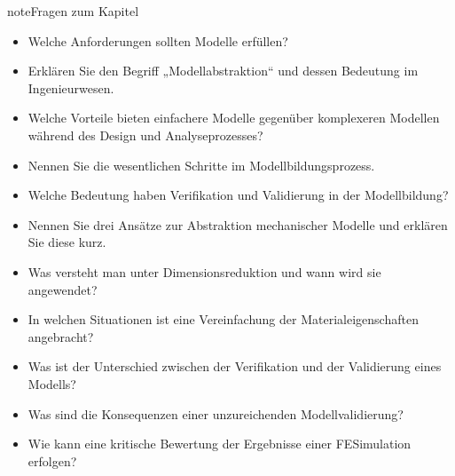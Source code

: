 \documentclass[letterpaper,10pt,german]{jupyterBook}
\begin{document}
\begin{sphinxadmonition}{note}{Fragen zum Kapitel}
\sphinxAtStartPar
{}
\begin{itemize}
\item {} 
\sphinxAtStartPar
Welche Anforderungen sollten Modelle erfüllen?

\item {} 
\sphinxAtStartPar
Erklären Sie den Begriff „Modellabstraktion“ und dessen Bedeutung im Ingenieurwesen.

\item {} 
\sphinxAtStartPar
Welche Vorteile bieten einfachere Modelle gegenüber komplexeren Modellen während des Design\sphinxhyphen{} und Analyseprozesses?

\end{itemize}

\sphinxAtStartPar
{}
\begin{itemize}
\item {} 
\sphinxAtStartPar
Nennen Sie die wesentlichen Schritte im Modellbildungsprozess.

\item {} 
\sphinxAtStartPar
Welche Bedeutung haben Verifikation und Validierung in der Modellbildung?

\end{itemize}

\sphinxAtStartPar
{}
\begin{itemize}
\item {} 
\sphinxAtStartPar
Nennen Sie drei Ansätze zur Abstraktion mechanischer Modelle und erklären Sie diese kurz.

\item {} 
\sphinxAtStartPar
Was versteht man unter Dimensionsreduktion und wann wird sie angewendet?

\item {} 
\sphinxAtStartPar
In welchen Situationen ist eine Vereinfachung der Materialeigenschaften angebracht?

\end{itemize}

\sphinxAtStartPar
{}
\begin{itemize}
\item {} 
\sphinxAtStartPar
Was ist der Unterschied zwischen der Verifikation und der Validierung eines Modells?

\item {} 
\sphinxAtStartPar
Was sind die Konsequenzen einer unzureichenden Modellvalidierung?

\item {} 
\sphinxAtStartPar
Wie kann eine kritische Bewertung der Ergebnisse einer FE\sphinxhyphen{}Simulation erfolgen?

\end{itemize}
\end{sphinxadmonition}
\end{document}
